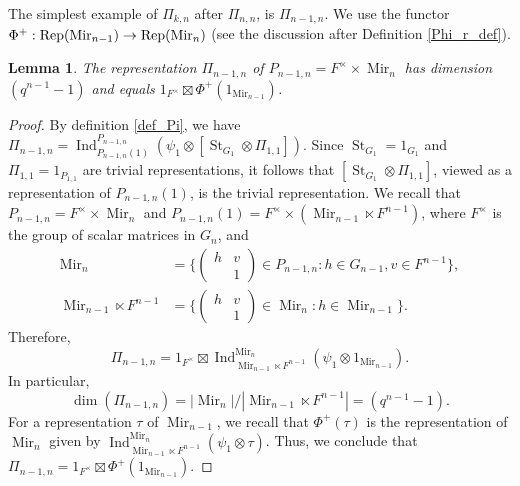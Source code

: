 \documentclass[reqno]{amsart}
\newtheorem{lemma}[theorem]{Lemma}
\theoremstyle{definition}
\theoremstyle{remark}
\numberwithin{equation}{section}
\DeclareMathOperator{\Ind}{Ind}
\DeclareMathOperator{\St}{St}
\DeclareMathOperator{\Mir}{Mir}
\newcommand{\bbsm}{\left (\begin{smallmatrix}}      \newcommand{\besm}{\end{smallmatrix}\right )}
\begin{document}
 The  simplest example of $\Pi_{k,n}$ after $\Pi_{n,n}$, is  $\Pi_{n-1,n}$. We use the functor $\Phi^+ : {\rm Rep}(\Mir_{n-1}) \to {\rm Rep}(\Mir_n)$ (see the discussion after Definition \ref{Phi_r_def}). 
\begin{lemma} \label{Pi_n-1_n}
The representation $\Pi_{n-1,n}$ of $P_{n-1,n}=F^\times \times \Mir_n$ has dimension $(q^{n-1}-1)$ and  equals $1_{F^\times} \boxtimes \Phi^+(1_{\Mir_{n-1}})$. 
\end{lemma}
\begin{proof}
By definition \ref{def_Pi}, we have $\Pi_{n-1,n}=\Ind_{P_{n-1,n}(1)}^{P_{n-1,n}} (\psi_1 \otimes [\St_{G_1} \otimes \Pi_{1,1}])$. Since $\St_{G_1} = 1_{G_1}$ and $\Pi_{1,1}=1_{P_{1,1}}$ are trivial representations, it follows that $[\St_{G_1} \otimes \Pi_{1,1}]$, viewed as a representation of $P_{n-1,n}(1)$,  is the trivial representation.
We recall that  $P_{n-1,n}=F^\times \times \Mir_n$ and $P_{n-1,n}(1)=F^\times \times (\Mir_{n-1} \ltimes F^{n-1})$, where $F^\times$ is the group of scalar matrices in $G_n$, and \begin{align*}
    \Mir_n&=\{ \bbsm h & v \\ & 1 \besm \in P_{n-1,n} \colon h \in G_{n-1}, v \in F^{n-1}\}, \\
\Mir_{n-1} \ltimes F^{n-1} &= \{ \bbsm h & v\\ & 1 \besm \in \Mir_n \colon h \in \Mir_{n-1}\}.
\end{align*}
Therefore,
\[ \Pi_{n-1,n}=1_{F^\times} \boxtimes \Ind_{\Mir_{n-1} \ltimes F^{n-1}}^{\Mir_n} (\psi_1 \otimes 1_{\Mir_{n-1}}). \]
In particular, 
\[ \dim(\Pi_{n-1,n})=|\Mir_n|/|\Mir_{n-1} \ltimes F^{n-1}|=(q^{n-1}-1).\]
For a representation $\tau$ of $\Mir_{n-1}$, we recall that 
$\Phi^+(\tau)$ is the representation of $\Mir_n$ given by $\Ind_{\Mir_{n-1} \ltimes F^{n-1}}^{\Mir_n} (\psi_1 \otimes \tau)$. Thus, we conclude that $\Pi_{n-1,n}=1_{F^\times} \boxtimes \Phi^+(1_{\Mir_{n-1}})$.
 \end{proof}
\end{document}
